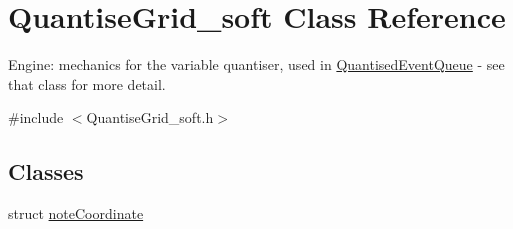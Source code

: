 \hypertarget{classQuantiseGrid__soft}{}\section{Quantise\+Grid\+\_\+soft Class Reference}
\label{classQuantiseGrid__soft}


Engine\+: mechanics for the variable quantiser, used in \mbox{\hyperlink{classQuantisedEventQueue}{Quantised\+Event\+Queue}} -\/ see that class for more detail.  




{\ttfamily \#include $<$Quantise\+Grid\+\_\+soft.\+h$>$}

\subsection*{Classes}
\begin{DoxyCompactItemize}
\item 
struct \mbox{\hyperlink{structQuantiseGrid__soft_1_1noteCoordinate}{note\+Coordinate}}
\end{DoxyCompactItemize}
